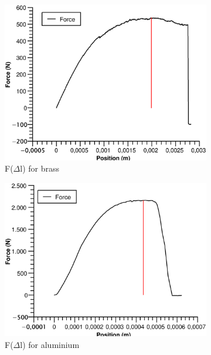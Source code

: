 \documentclass{scrartcl}
\begin{document}
\begin{figure}[!ht]
    \centering
    \begin{subfigure}{0.32\textwidth}
        \includegraphics[width=\textwidth]{Shear/ShearBrass.eps}
        \caption{F($\Delta$l) for brass}
        \label{fig:shearBrass}
    \end{subfigure}
    \begin{subfigure}{0.32\textwidth}
        \includegraphics[width=\textwidth]{Shear/ShearAlu.eps}
        \caption{F($\Delta$l) for aluminium}
        \label{fig:shearAlu}
    \end{subfigure}
    \begin{subfigure}{0.32\textwidth}

\end{subfigure}
\end{figure}
\end{document}
